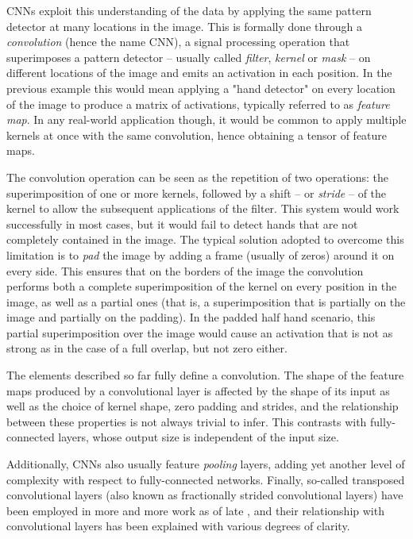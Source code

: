 CNNs exploit this understanding of the data by applying the same pattern
detector at many locations in the image. This is formally done through a
\emph{convolution} (hence the name CNN), a signal processing operation that
superimposes a pattern detector -- usually called \emph{filter}, \emph{kernel}
or \emph{mask} -- on different locations of the image and emits an activation
in each position. In the previous example this would mean applying a "hand
detector" on every location of the image to produce a matrix of activations,
typically referred to as \emph{feature map}. In any real-world application
though, it would be common to apply multiple kernels at once with the same
convolution, hence obtaining a tensor of feature maps.

The convolution operation can be seen as the repetition of two operations: the
superimposition of one or more kernels, followed by a shift -- or \emph{stride}
-- of the kernel to allow the subsequent applications of the filter. This
system would work successfully in most cases, but it would fail to detect hands
that are not completely contained in the image. The typical solution adopted to
overcome this limitation is to \emph{pad} the image by adding a frame (usually
of zeros) around it on every side. This ensures that on the borders of the
image the convolution performs both a complete superimposition of the kernel on
every position in the image, as well as a partial ones (that is, a
superimposition that is partially on the image and partially on the padding).
In the padded half hand scenario, this partial superimposition over the image
would cause an activation that is not as strong as in the case of a full
overlap, but not zero either.

The elements described so far fully define a convolution. The shape of the
feature maps produced by a convolutional layer is affected by the shape of its
input as well as the choice of kernel shape, zero padding and strides, and the
relationship between these properties is not always trivial to infer. This
contrasts with fully-connected layers, whose output size is independent of the
input size.

Additionally, CNNs also usually feature {\em pooling\/} layers, adding yet
another level of complexity with respect to fully-connected networks. Finally,
so-called transposed convolutional layers (also known as fractionally strided
convolutional layers) have been employed in more and more work as of late
\citep{zeiler2011adaptive,zeiler2014visualizing,
long2015fully,radford2015unsupervised,Visin_2016_CVPR_Workshops,
im2016generating}, and their relationship with convolutional layers has been
explained with various degrees of clarity.

